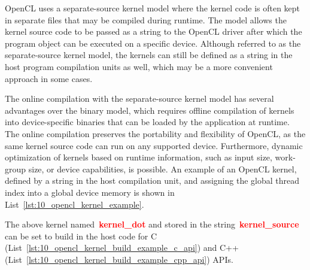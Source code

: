 \par
OpenCL uses a separate-source kernel model where the kernel code is often kept in separate files that may be compiled during runtime.
The model allows the kernel source code to be passed as a string to the OpenCL driver after which the program object can be executed on a specific device.
Although referred to as the separate-source kernel model, the kernels can still be defined as a string in the host program compilation units as well, which may be a more convenient approach in some cases.


\par
The online compilation with the separate-source kernel model has several advantages over the binary model, which requires offline compilation of kernels into device-specific binaries that can be loaded by the application at runtime.
The online compilation preserves the portability and flexibility of OpenCL, as the same kernel source code can run on any supported device.
Furthermore, dynamic optimization of kernels based on runtime information, such as input size, work-group size, or device capabilities, is possible.
An example of an OpenCL kernel, defined by a string in the host compilation unit, and assigning the global thread index into a global device memory is shown in List~\ref{lst:10_opencl_kernel_example}.





\par
The above kernel named~\textbf{\textcolor{red}{kernel\_dot}} and stored in the string~\textbf{\textcolor{red}{kernel\_source}} can be set to build in the host code for C (List~\ref{lst:10_opencl_kernel_build_example_c_api}) and C++ (List~\ref{lst:10_opencl_kernel_build_example_cpp_api}) APIs.








